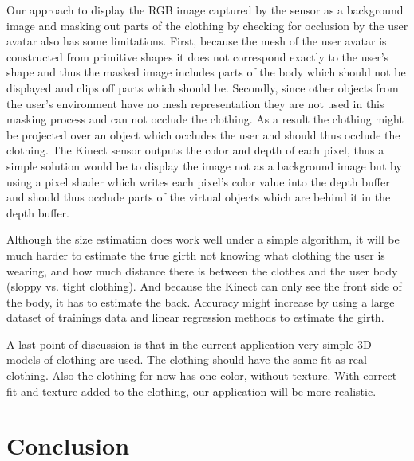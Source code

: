 \documentclass[twocolumn,a4paper]{article}
\begin{document}
Our approach to display the RGB image captured by the sensor as a background image and masking out parts of the clothing by checking for occlusion by the user avatar also has some limitations. First, because the mesh of the user avatar is constructed from primitive shapes it does not correspond exactly to the user's shape and thus the masked image includes parts of the body which should not be displayed and clips off parts which should be. Secondly, since other objects from the user's environment have no mesh representation they are not used in this masking process and can not occlude the clothing. As a result the clothing might be projected over an object which occludes the user and should thus occlude the clothing. The Kinect sensor outputs the color and depth of each pixel, thus a simple solution would be to display the image not as a background image but by using a pixel shader which writes each pixel's color value into the depth buffer and should thus occlude parts of the virtual objects which are behind it in the depth buffer.

Although the size estimation does work well under a simple algorithm, it will be much harder to estimate the true girth not knowing what clothing the user is wearing, and how much distance there is between the clothes and the user body (sloppy vs. tight clothing). And because the Kinect can only see the front side of the body, it has to estimate the back. 
Accuracy might increase by using a large dataset of trainings data and linear regression methods to estimate the girth.

A last point of discussion is that in the current application very simple 3D models of clothing are used. The clothing should have the same fit as real clothing. Also the clothing for now has one color, without texture. With correct fit and texture added to the clothing, our application will be more realistic.

\section{Conclusion}
\label{sec:conclusion}
\end{document}
